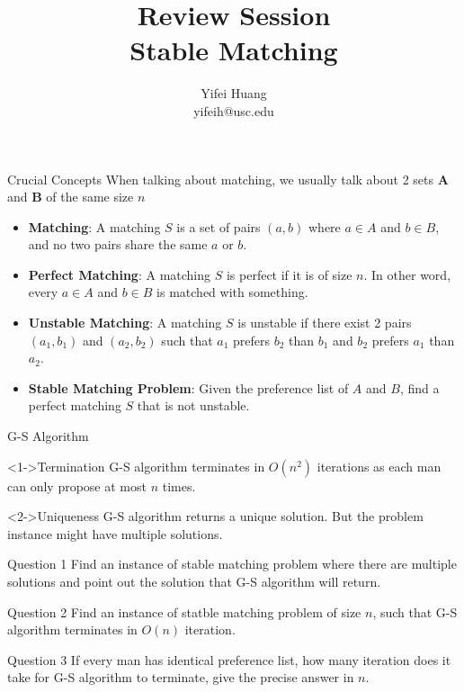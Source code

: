 \documentclass{beamer}
\title{Review Session\\ Stable Matching}
\author{Yifei Huang \\ yifeih@usc.edu}
\begin{document}
\begin{frame}
	\maketitle
\end{frame}
\begin{frame}{Crucial Concepts}
	When talking about matching, we usually talk about 2 sets \textbf{A} and \textbf{B} of the same size $n$
	\begin{itemize}
		\item<1-> \textbf{Matching}: A matching $S$ is a set of pairs $(a,b)$ where $a \in A$ and $b \in B$, and no two
			pairs share the same $a$ or $b$.
		\item<2-> \textbf{Perfect Matching}: A matching $S$ is perfect if it is of size $n$. In other word, every $a \in A$
			and $b \in B$ is matched with something.
		\item<3-> \textbf{Unstable Matching}: A matching $S$ is unstable if there exist 2 pairs $(a_1,b_1)$ and $(a_2,b_2)$
			such that $a_1$ prefers $b_2$ than $b_1$ and $b_2$ prefers $a_1$ than $a_2$.
		\item<4-> \textbf{Stable Matching Problem}: Given the preference list of $A$ and $B$, find a perfect matching $S$
			that is not unstable.
	\end{itemize}
\end{frame}

\begin{frame}{G-S Algorithm}
	\begin{block}<1->{Termination}
		G-S algorithm terminates in $O(n^2)$ iterations as each man can only propose at most $n$ times.
	\end{block}
	\begin{alertblock}<2->{Uniqueness}
		G-S algorithm returns a unique solution. But the problem instance might have multiple solutions.
	\end{alertblock}
\end{frame}

\begin{frame}{Question 1}
	Find an instance of stable matching problem where there are multiple solutions and point out the solution that G-S
	algorithm will return.
\end{frame}

\begin{frame}{Question 2}
	Find an instance of statble matching problem of size $n$, such that G-S algorithm terminates in $O(n)$ iteration.
\end{frame}

\begin{frame}{Question 3}
	If every man has identical preference list, how many iteration does it take for G-S algorithm to terminate, give the
	precise answer in $n$.
\end{frame}
\end{document}
